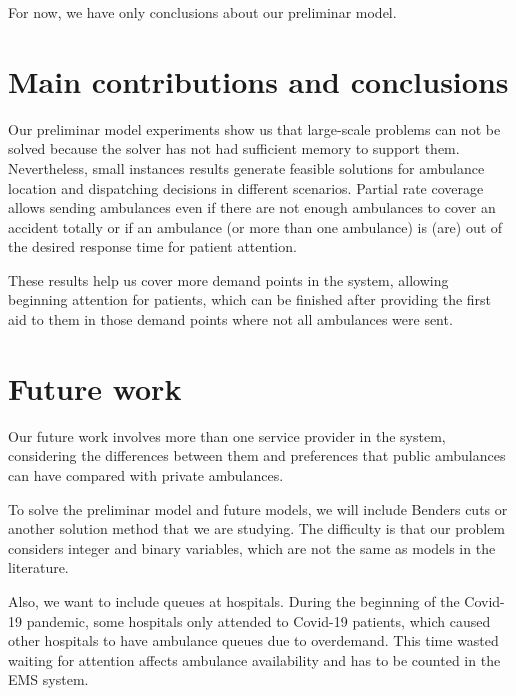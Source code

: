 For now, we have only conclusions about our preliminar model.

\section{Main contributions and conclusions}

Our preliminar model experiments show us that large-scale problems can not be solved because the solver has not had sufficient memory to support them. Nevertheless, small instances results generate feasible solutions for ambulance location and dispatching decisions in different scenarios. Partial rate coverage allows sending ambulances even if there are not enough ambulances to cover an accident totally or if an ambulance (or more than one ambulance) is (are) out of the desired response time for patient attention. 

These results help us cover more demand points in the system, allowing beginning attention for patients, which can be finished after providing the first aid to them in those demand points where not all ambulances were sent. 


\section{Future work}

Our future work involves more than one service provider in the system, considering the differences between them and preferences that public ambulances can have compared with private ambulances. 

To solve the preliminar model and future models, we will include Benders cuts or another solution method that we are studying. The difficulty is that our problem considers integer and binary variables, which are not the same as models in the literature.

Also, we want to include queues at hospitals. During the beginning of the Covid-19 pandemic, some hospitals only attended to Covid-19 patients, which caused other hospitals to have ambulance queues due to overdemand. This time wasted waiting for attention affects ambulance availability and has to be counted in the EMS system. 